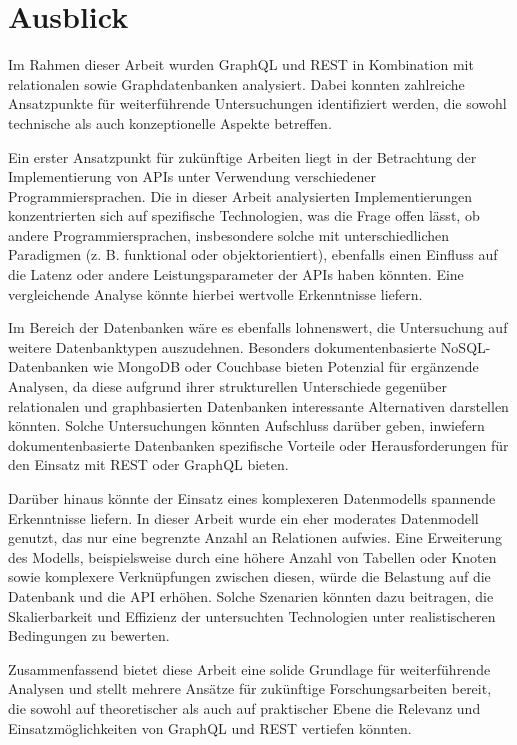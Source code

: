 \chapter{Ausblick} %
\label{sec:ausblick}
Im Rahmen dieser Arbeit wurden GraphQL und REST in Kombination mit relationalen sowie Graphdatenbanken analysiert. Dabei konnten zahlreiche Ansatzpunkte für weiterführende Untersuchungen identifiziert werden, die sowohl technische als auch konzeptionelle Aspekte betreffen.

\noindent
Ein erster Ansatzpunkt für zukünftige Arbeiten liegt in der Betrachtung der Implementierung von APIs unter Verwendung verschiedener Programmiersprachen. Die in dieser Arbeit analysierten Implementierungen konzentrierten sich auf spezifische Technologien, was die Frage offen lässt, ob andere Programmiersprachen, insbesondere solche mit unterschiedlichen Paradigmen (z. B. funktional oder objektorientiert), ebenfalls einen Einfluss auf die Latenz oder andere Leistungsparameter der APIs haben könnten. Eine vergleichende Analyse könnte hierbei wertvolle Erkenntnisse liefern.

\noindent
Im Bereich der Datenbanken wäre es ebenfalls lohnenswert, die Untersuchung auf weitere Datenbanktypen auszudehnen. Besonders dokumentenbasierte NoSQL-Datenbanken wie MongoDB oder Couchbase bieten Potenzial für ergänzende Analysen, da diese aufgrund ihrer strukturellen Unterschiede gegenüber relationalen und graphbasierten Datenbanken interessante Alternativen darstellen könnten. Solche Untersuchungen könnten Aufschluss darüber geben, inwiefern dokumentenbasierte Datenbanken spezifische Vorteile oder Herausforderungen für den Einsatz mit REST oder GraphQL bieten.

\noindent
Darüber hinaus könnte der Einsatz eines komplexeren Datenmodells spannende Erkenntnisse liefern. In dieser Arbeit wurde ein eher moderates Datenmodell genutzt, das nur eine begrenzte Anzahl an Relationen aufwies. Eine Erweiterung des Modells, beispielsweise durch eine höhere Anzahl von Tabellen oder Knoten sowie komplexere Verknüpfungen zwischen diesen, würde die Belastung auf die Datenbank und die API erhöhen. Solche Szenarien könnten dazu beitragen, die Skalierbarkeit und Effizienz der untersuchten Technologien unter realistischeren Bedingungen zu bewerten.

\noindent
Zusammenfassend bietet diese Arbeit eine solide Grundlage für weiterführende Analysen und stellt mehrere Ansätze für zukünftige Forschungsarbeiten bereit, die sowohl auf theoretischer als auch auf praktischer Ebene die Relevanz und Einsatzmöglichkeiten von GraphQL und REST vertiefen könnten.

